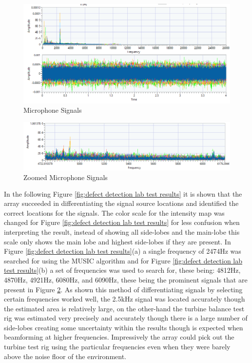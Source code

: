 \documentclass{UoNMCHA}
\numberwithin{equation}{section}
\begin{document}
    \begin{figure} [H]
        \centering
        \includegraphics[keepaspectratio, width = \textwidth]{Figures/Raw Sound Waves.png}
        \caption{Microphone Signals}
        \label{fig:mic signals lab test}
    \end{figure}
    
    \begin{figure} [H]
        \centering
        \includegraphics[keepaspectratio, width = \textwidth]{Figures/Zoomed Sound Waves.png}
        \caption{Zoomed Microphone Signals}
        \label{fig:zoom mic signals lab test}
    \end{figure}
    
    In the following Figure \ref{fig:defect detection lab test results} it is shown that the array succeeded in differentiating the signal source locations and identified the correct locations for the signals. The color scale for the intensity map was changed for Figure \ref{fig:defect detection lab test results} for less confusion when interpreting the result, instead of showing all side-lobes and the main-lobe this scale only shows the main lobe and highest side-lobes if they are present. In Figure \ref{fig:defect detection lab test results}(a) a single frequency of 2474Hz was searched for using the MUSIC algorithm and for Figure \ref{fig:defect detection lab test results}(b) a set of frequencies was used to search for, these being: 4812Hz, 4870Hz, 4921Hz, 6080Hz, and 6090Hz, these being the prominent signals that are present in Figure \ref{fig:zoom mic signals lab test}. As shown this method of differentiating signals by selecting certain frequencies worked well, the 2.5kHz signal was located accurately though the estimated area is relatively large, on the other-hand the turbine balance test rig was estimated very precisely and accurately though there is a large number of side-lobes creating some uncertainty within the results though is expected when beamforming at higher frequencies. Impressively the array could pick out the turbine test rig using the particular frequencies even when they were barely above the noise floor of the environment.
    
\end{document}

